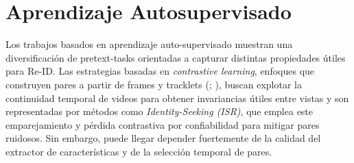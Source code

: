 \section{Aprendizaje Autosupervisado}

Los trabajos basados en aprendizaje auto-supervisado muestran una diversificación de pretext-tasks orientadas a capturar distintas propiedades útiles para Re-ID. Las estrategias basadas en \textit{contrastive learning}, enfoques que construyen pares a partir de frames y tracklets (\cite{Zheng2022PASS}; \cite{Dou2023IdentitySeeking}), buscan explotar la continuidad temporal de videos para obtener invariancias útiles entre vistas y son representadas por métodos como \textit{Identity-Seeking (ISR)}, que emplea este emparejamiento y pérdida contrastiva por confiabilidad para mitigar pares ruidosos. Sin embargo, puede llegar depender fuertemente de la calidad del extractor de características y de la selección temporal de pares.

